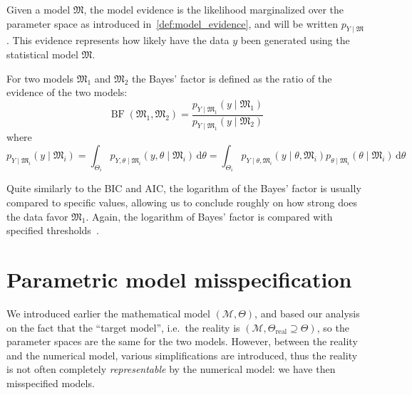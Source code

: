 \documentclass[../../Main_ManuscritThese.tex]{subfiles}
\begin{document}
Given a model $\mathfrak{M}$, the model evidence is the likelihood marginalized over the parameter space as introduced in~\cref{def:model_evidence}, and will be written $p_{Y\mid \mathfrak{M}}$. This evidence represents how likely have the data $y$ been generated using the statistical model $\mathfrak{M}$.

For two models $\mathfrak{M}_1$ and $\mathfrak{M}_2$ the Bayes' factor is defined as the ratio of the evidence of the two models:
\begin{equation}
  \label{eq:bayes_factor}
  \mathop{\mathrm{BF}}(\mathfrak{M}_1,\mathfrak{M}_2)= \frac{p_{Y\mid \mathfrak{M}_1}(y \mid \mathfrak{M}_1) }{p_{Y\mid \mathfrak{M}_1}(y \mid \mathfrak{M}_2)}
\end{equation}
where
\begin{equation}
  p_{Y \mid \mathfrak{M}_i}(y \mid \mathfrak{M}_i)= \int_{\Theta_i} p_{Y, \theta \mid \mathfrak{M}_i}(y, \theta \mid \mathfrak{M}_i) \,\mathrm{d}\theta= \int_{\Theta_i} p_{Y \mid \theta,\mathfrak{M}_i}(y \mid \theta, \mathfrak{M}_i)p_{\theta \mid \mathfrak{M}_i}(\theta \mid \mathfrak{M}_i) \,\mathrm{d}\theta 
\end{equation}

Quite similarly to the BIC and AIC, the logarithm of the Bayes' factor is usually compared to specific values, allowing us to conclude roughly on how strong does the data favor $\mathfrak{M}_1$. Again, the logarithm of Bayes' factor is compared with specified thresholds~\cite{kass_bayes_1995,burnham_multimodel_2004}.

\section{Parametric model misspecification}
\label{sec:model_misspecification}
We introduced earlier the mathematical model $(\mathcal{M},\Theta)$, and based our analysis on the fact that the ``target model'', i.e.\ the reality is $(\mathscr{M},\Theta_{\mathrm{real}} \supseteq \Theta)$, so the parameter spaces are the same for the two models. However, between the reality and the numerical model, various simplifications are introduced, thus the reality is not often completely \emph{representable} by the numerical model: we have then misspecified models.
\end{document}
